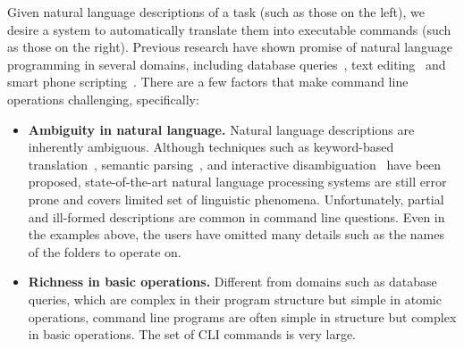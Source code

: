 Given natural language descriptions of a task (such as those on the left), we desire a system to automatically translate them into executable commands (such as those on the right). 
Previous research have shown promise of natural language programming in several domains, including database queries~\cite{DBLP:journals/pvldb/LiJ14, DBLP:conf/sigmod/GulwaniM14}, text editing~\cite{DBLP:journals/corr/DesaiGHJKMRR15} and smart phone scripting~\cite{DBLP:conf/mobisys/LeGS13}. 
There are a few factors that make command line operations challenging, specifically:
\begin{itemize}
\item \textbf{Ambiguity in natural language.} Natural language descriptions are inherently ambiguous. Although techniques such as keyword-based translation~\cite{DBLP:conf/sigmod/GulwaniM14}, semantic parsing~\citep{Zettlemoyer05learningto}, and interactive disambiguation~\cite{DBLP:journals/pvldb/LiJ14} have been proposed, state-of-the-art natural language processing systems are still error prone and covers limited set of linguistic phenomena.
Unfortunately, partial and ill-formed descriptions are common in command line questions. Even in the examples above, the users have omitted many details such as the names of the folders to operate on.
\item \textbf{Richness in basic operations.} Different from domains such as database queries, which are complex in their program structure but simple in atomic operations, command line programs are often simple in structure but complex in basic operations. The set of CLI commands is very large.
\end{itemize}
